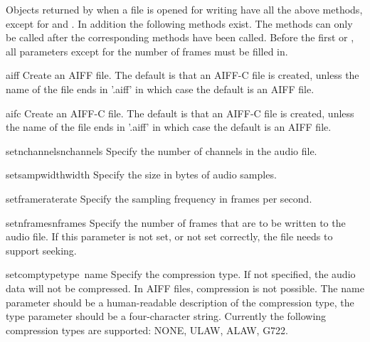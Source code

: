 Objects returned by  when a file is opened for
writing have all the above methods, except for  and
.  In addition the following methods exist.  The
 methods can only be called after the corresponding
 methods have been called.  Before the first
 or , all parameters except for
the number of frames must be filled in.

\begin{funcdesc}{aiff}{}
Create an AIFF file.  The default is that an AIFF-C file is created,
unless the name of the file ends in '.aiff' in which case the default
is an AIFF file.
\end{funcdesc}

\begin{funcdesc}{aifc}{}
Create an AIFF-C file.  The default is that an AIFF-C file is created,
unless the name of the file ends in '.aiff' in which case the default
is an AIFF file.
\end{funcdesc}

\begin{funcdesc}{setnchannels}{nchannels}
Specify the number of channels in the audio file.
\end{funcdesc}

\begin{funcdesc}{setsampwidth}{width}
Specify the size in bytes of audio samples.
\end{funcdesc}

\begin{funcdesc}{setframerate}{rate}
Specify the sampling frequency in frames per second.
\end{funcdesc}

\begin{funcdesc}{setnframes}{nframes}
Specify the number of frames that are to be written to the audio file.
If this parameter is not set, or not set correctly, the file needs to
support seeking.
\end{funcdesc}

\begin{funcdesc}{setcomptype}{type\, name}
Specify the compression type.  If not specified, the audio data will
not be compressed.  In AIFF files, compression is not possible.  The
name parameter should be a human-readable description of the
compression type, the type parameter should be a four-character
string.  Currently the following compression types are supported:
NONE, ULAW, ALAW, G722.
\end{funcdesc}

